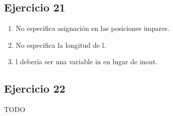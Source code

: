 \subsection{Ejercicio 21}
\begin{enumerate}
    \item No especifica asignación en las posiciones impares.
    \item No especifica la longitud de l.
    \item l debería ser una variable in en lugar de inout.
\end{enumerate}

\subsection{Ejercicio 22}
TODO



